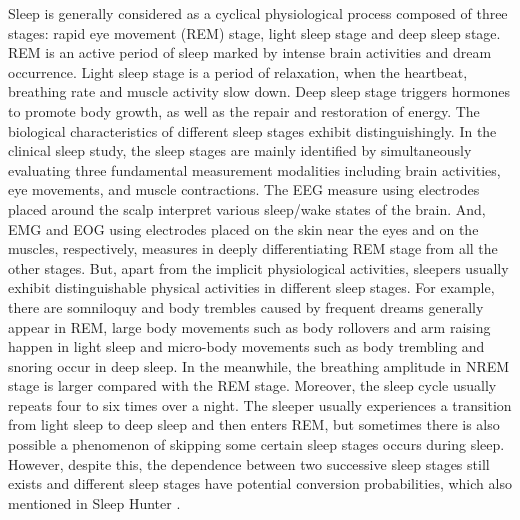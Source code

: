 Sleep is generally considered as a cyclical physiological process composed of three stages: rapid eye movement (REM) stage, light sleep
stage and deep sleep stage. REM is an active period of sleep marked by intense brain activities and dream occurrence. Light sleep stage is
a period of relaxation, when the heartbeat, breathing rate and muscle activity slow down. Deep sleep stage triggers hormones to promote
body growth, as well as the repair and restoration of energy.  The biological characteristics of different sleep stages exhibit
distinguishingly. In the clinical sleep study, the sleep stages are mainly identified by simultaneously evaluating three fundamental
measurement modalities including brain activities, eye movements, and muscle contractions. The EEG measure using electrodes placed around
the scalp interpret various sleep/wake states of the brain. And, EMG and EOG using electrodes placed on the skin near the eyes and on the
muscles, respectively, measures in deeply differentiating REM stage from all the other stages. But, apart from the implicit physiological
activities, sleepers usually exhibit distinguishable physical activities in different sleep stages. For example, there are somniloquy and
body trembles caused by frequent dreams generally appear in REM, large body movements such as body rollovers and arm raising happen in
light sleep and micro-body movements such as body trembling and snoring occur in deep sleep.  In the meanwhile, the breathing amplitude in
NREM stage is larger compared with the REM stage. Moreover, the sleep cycle usually repeats four to six times over a night. The sleeper
usually experiences a transition from light sleep to deep sleep and then enters REM, but sometimes there is also possible a phenomenon of
skipping some certain sleep stages occurs during sleep. However, despite this, the dependence between two successive sleep stages still
exists and different sleep stages have potential conversion probabilities, which also mentioned in Sleep Hunter \cite{gu2016sleep}.

